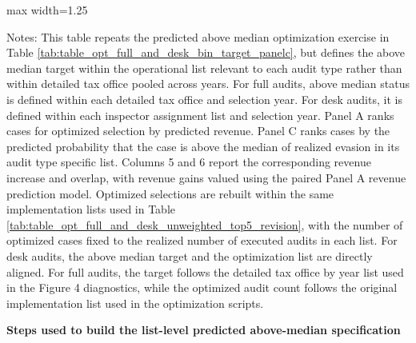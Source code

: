 \documentclass{article}
\newcommand{\OutPath}{Output/}%
\newcommand{\OutPath}{../Output/}%
\begin{document}
\begin{landscape}
\begin{table}[H]\centering
\begin{adjustbox}{max width=1.25\textwidth}
\begin{threeparttable}
\caption{Optimization Gains from Machine-Learning Algorithm Trained on Audit Outcome Data: Predicted Above-Median Evasion in the List}
\label{tab:table_opt_full_and_desk_bin_target_panelc_listyear}

\footnotesize


\begin{tablenotes}[flushleft]
\footnotesize
\item Notes: This table repeats the predicted above median optimization exercise in Table \ref{tab:table_opt_full_and_desk_bin_target_panelc}, but defines the above median target within the operational list relevant to each audit type rather than within detailed tax office pooled across years. For full audits, above median status is defined within each detailed tax office and selection year. For desk audits, it is defined within each inspector assignment list and selection year. Panel A ranks cases for optimized selection by predicted revenue. Panel C ranks cases by the predicted probability that the case is above the median of realized evasion in its audit type specific list. Columns 5 and 6 report the corresponding revenue increase and overlap, with revenue gains valued using the paired Panel A revenue prediction model. Optimized selections are rebuilt within the same implementation lists used in Table \ref{tab:table_opt_full_and_desk_unweighted_top5_revision}, with the number of optimized cases fixed to the realized number of executed audits in each list. For desk audits, the above median target and the optimization list are directly aligned. For full audits, the target follows the detailed tax office by year list used in the Figure 4 diagnostics, while the optimized audit count follows the original implementation list used in the optimization scripts.
\end{tablenotes}
\end{threeparttable}
\end{adjustbox}
\end{table}
\end{landscape}

\noindent\textbf{Steps used to build the list-level predicted above-median specification}
\medskip
\end{document}
